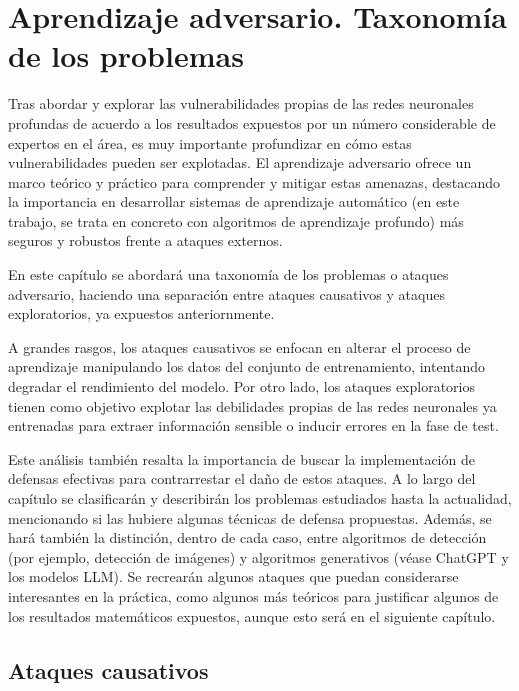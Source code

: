 
\chapter{Aprendizaje adversario. Taxonomía de los problemas}
\label{cap:capitulo3}

Tras abordar y explorar las vulnerabilidades propias de las redes neuronales profundas de acuerdo a los resultados expuestos por un número considerable de expertos en el área, es muy importante profundizar en cómo estas vulnerabilidades pueden ser explotadas. El aprendizaje adversario ofrece un marco teórico y práctico para comprender y mitigar estas amenazas, destacando la importancia en desarrollar sistemas de aprendizaje automático (en este trabajo, se trata en concreto con algoritmos de aprendizaje profundo) más seguros y robustos frente a ataques externos.

En este capítulo se abordará una taxonomía de los problemas o ataques adversario, haciendo una separación entre ataques causativos y ataques exploratorios, ya expuestos anteriornmente.

A grandes rasgos, los ataques causativos se enfocan en alterar el proceso de aprendizaje manipulando los datos del conjunto de entrenamiento, intentando degradar el rendimiento del modelo. Por otro lado, los ataques exploratorios tienen como objetivo explotar las debilidades propias de las redes neuronales ya entrenadas para extraer información sensible o inducir errores en la fase de test.

Este análisis también resalta la importancia de buscar la implementación de defensas efectivas para contrarrestar el daño de estos ataques. A lo largo del capítulo se clasificarán y describirán los problemas estudiados hasta la actualidad, mencionando si las hubiere algunas técnicas de defensa propuestas. Además, se hará también la distinción, dentro de cada caso, entre algoritmos de detección (por ejemplo, detección de imágenes) y algoritmos generativos (véase ChatGPT y los modelos LLM). Se recrearán algunos ataques que puedan considerarse interesantes en la práctica, como algunos más teóricos para justificar algunos de los resultados matemáticos expuestos, aunque esto será en el siguiente capítulo.

\section{Ataques causativos}

